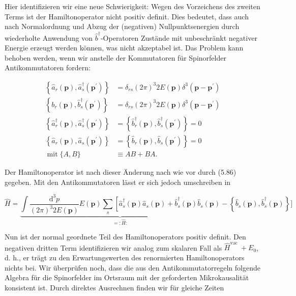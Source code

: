 \documentclass[10pt, letterpaper]{article}
\begin{document}
Hier identifizieren wir eine neue Schwierigkeit: Wegen des Vorzeichens des zweiten Terms ist der Hamiltonoperator nicht positiv definit. Dies bedeutet, dass auch nach Normalordnung und Abzug der (negativen) Nullpunktsenergien durch wiederholte Anwendung von $\hat{b}^{\dagger}$-Operatoren Zustände mit unbeschränkt negativer Energie erzeugt werden können, was nicht akzeptabel ist. Das Problem kann behoben werden, wenn wir anstelle der Kommutatoren für Spinorfelder Antikommutatoren fordern:

$$
\begin{aligned}
\left\{\hat{a}_{r}(\mathbf{p}), \hat{a}_{s}^{\dagger}\left(\mathbf{p}^{\prime}\right)\right\} & =\delta_{r s}(2 \pi)^{3} 2 E(\mathbf{p}) \delta^{3}\left(\mathbf{p}-\mathbf{p}^{\prime}\right) \\
\left\{b_{r}(\mathbf{p}), \hat{b}_{s}^{\dagger}\left(\mathbf{p}^{\prime}\right)\right\} & =\delta_{r s}(2 \pi)^{3} 2 E(\mathbf{p}) \delta^{3}\left(\mathbf{p}-\mathbf{p}^{\prime}\right) \\
\left\{\hat{a}_{r}^{\dagger}(\mathbf{p}), \hat{a}_{s}^{\dagger}\left(\mathbf{p}^{\prime}\right)\right\} & =\left\{\hat{b}_{r}^{\dagger}(\mathbf{p}), \hat{b}_{s}^{\dagger}\left(\mathbf{p}^{\prime}\right)\right\}=0 \\
\left\{\hat{a}_{r}(\mathbf{p}), \hat{a}_{s}\left(\mathbf{p}^{\prime}\right)\right\} & =\left\{\hat{b}_{r}(\mathbf{p}), \hat{b}_{s}\left(\mathbf{p}^{\prime}\right)\right\}=0 \\
\operatorname{mit}\{A, B\} & \equiv A B+B A .
\end{aligned}
$$

Der Hamiltonoperator ist nach dieser Änderung nach wie vor durch (5.86) gegeben. Mit den Antikommutatoren lässt er sich jedoch umschreiben in

$$
\hat{H}=\underbrace{\int \frac{\mathrm{d}^{3} p}{(2 \pi)^{3} 2 E(\mathbf{p})} E(\mathbf{p}) \sum_{s}\left[\hat{a}_{s}^{\dagger}(\mathbf{p}) \hat{a}_{s}(\mathbf{p})+\hat{b}_{s}^{\dagger}(\mathbf{p}) \hat{b}_{s}(\mathbf{p})\right.}_{=: \hat{H}:}-\left\{\hat{b}_{s}(\mathbf{p}), \hat{b}_{s}^{\dagger}(\mathbf{p})\right\}]
$$

Nun ist der normal geordnete Teil des Hamiltonoperators positiv definit. Den negativen dritten Term identifizieren wir analog zum skalaren Fall als $\hat{H}^{\text {vac }}+E_{0}$, d. h., er trägt zu den Erwartungswerten des renormierten Hamiltonoperators nichts bei. Wir überprüfen noch, dass die aus den Antikommutatorregeln folgende Algebra für die Spinorfelder im Ortsraum mit der geforderten Mikrokausalität konsistent ist. Durch direktes Ausrechnen finden wir für gleiche Zeiten
\end{document}
